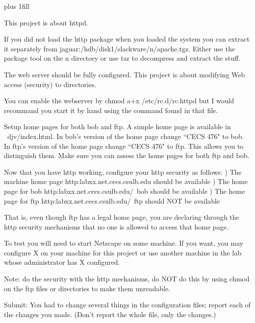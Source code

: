 
\rightskip=0pt plus 1fill

\parindent 0pt

This project is about httpd.

If you did not load the http package when you loaded the system you can
extract it separately from
{\ltt{}jaguar:/hdb/disk1/slackware/n/apache.tgz}.
Either use the package tool on the n directory or 
use tar to decompress and extract the stuff.

The web server should be fully configured.
This project is about modifying Web access (security) to
directories.

You can enable the webserver by 
{\ltt{}chmod a+x /etc/rc.d/rc.httpd}
but I would recommand you start it by hand using
the command found in that file.

Setup home pages for both bob and ftp.
A simple home page is available in {\ltt{}~djv/index.html}.
In bob's version of the home page change ``CECS 476" to bob.
In ftp's version of the home page change ``CECS 476" to ftp.
This allows you to distinguish them.
Make sure you can assess the home pages for both ftp and bob.

Now that you have http working,
configure your http security as follows:
\hfill{}) The machine home page {\ltt{}http:labxx.net.cecs.csulb.edu}
should be available
\hfill{}) The home page for bob {\ltt{}http:labxx.net.cecs.csulb.edu/~bob}
should be available
\hfill{}) The home page for ftp {\ltt{}http:labxx.net.cecs.csulb.edu/~ftp}
should NOT be available

That is, even though ftp has a legal home page, you are declaring
through the http security mechanisms that no one is allowed to
access that home page.

To test you will need to start Netscape on some machine. 
If you want, you may configure X on your machine for this project or use 
another machine in the lab whose administrator has X configured.

Note: do the security with the http mechanisms, do NOT do
this by using
{\ltt{}chmod} on the ftp files or directories to make them unreadable.

Submit: 
You had to change several things in the configuration files;
report each of the changes you made.
(Don't report the whole file, only the changes.)

\bye
